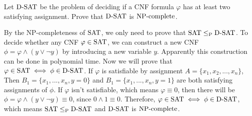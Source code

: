 \documentclass{homework}
\begin{document}
\begin{problem}
  Let $\mathrm{D\text{-}SAT}$ be the problem of deciding if a CNF formula
  $\varphi$ has at least two satisfying assignment.
  Prove that $\mathrm{D\text{-}SAT}$ is $\textup{NP}\text{-complete}$.
\end{problem}

\begin{solution}
  By the NP-completeness of $\mathrm{SAT}$, we only need to prove that $\mathrm{SAT}\le_\textup{P}\mathrm{D\text{-}SAT}$. To decide whether any CNF $\varphi\in\mathrm{SAT}$, we can construct a new CNF $\phi = \varphi \land (y\lor \neg y) $ by introducing a new variable $y$. Apparently this construction can be done in polynomial time. Now we will prove that $\varphi\in\mathrm{SAT}\iff\phi\in\mathrm{D\text{-}SAT}$. If $\varphi$ is satisfiable by assignment $A=\{x_1,x_2,...,x_n\}$, Then $B_1 = \{x_1,...,x_n,y=0\}$ and $B_1 = \{x_1,...,x_n,y=1\}$ are both satisfying assignments of $\phi$. If $\varphi$ isn't satisfiable, which means $\varphi\equiv 0$, then there will be $\phi=\varphi\land (y\lor \neg y)\equiv 0$, since $0\land 1\equiv 0$. Therefore, $\varphi\in\mathrm{SAT}\iff\phi\in\mathrm{D\text{-}SAT}$, which means $\mathrm{SAT}\le_\textup{P}\mathrm{D\text{-}SAT}$ and $\mathrm{D\text{-}SAT}$ is $\textup{NP}\text{-complete}$. 
\end{solution}
\end{document}
